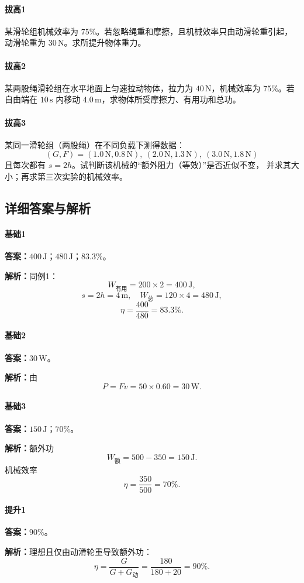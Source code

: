 \documentclass[12pt,a4paper]{ctexart}
\newcommand{\Ans}[1]{\par\noindent\textbf{答案：}#1\par}
\newcommand{\Sol}[1]{\par\noindent\textbf{解析：}#1\par}
\begin{document}
\paragraph{拔高1}
某滑轮组机械效率为 $75\%$。若忽略绳重和摩擦，且机械效率只由动滑轮重引起，
动滑轮重为 $30\,\mathrm{N}$。求所提升物体重力。

\paragraph{拔高2}
某两股绳滑轮组在水平地面上匀速拉动物体，拉力为 $40\,\mathrm{N}$，机械效率为
$75\%$。若自由端在 $10\,\mathrm{s}$ 内移动 $4.0\,\mathrm{m}$，求物体所受摩擦力、有用功和总功。

\paragraph{拔高3}
某同一滑轮组（两股绳）在不同负载下测得数据：
\[
(G,F)=(1.0\,\mathrm{N},0.8\,\mathrm{N}),\ (2.0\,\mathrm{N},1.3\,\mathrm{N}),\ (3.0\,\mathrm{N},1.8\,\mathrm{N})
\]
且每次都有 $s=2h$。试判断该机械的“额外阻力（等效）”是否近似不变，
并求其大小；再求第三次实验的机械效率。

\subsection{详细答案与解析}

\paragraph{基础1}
\Ans{$400\,\mathrm{J}$；$480\,\mathrm{J}$；$83.3\%$。}
\Sol{同例1：
\[
W_{\text{有用}}=200\times 2=400\,\mathrm{J},
\]
\[
s=2h=4\,\mathrm{m},\quad W_{\text{总}}=120\times 4=480\,\mathrm{J},
\]
\[
\eta=\frac{400}{480}=83.3\%.
\]}

\paragraph{基础2}
\Ans{$30\,\mathrm{W}$。}
\Sol{由
\[
P=Fv=50\times 0.60=30\,\mathrm{W}.
\]}

\paragraph{基础3}
\Ans{$150\,\mathrm{J}$；$70\%$。}
\Sol{额外功
\[
W_{\text{额}}=500-350=150\,\mathrm{J}.
\]
机械效率
\[
\eta=\frac{350}{500}=70\%.
\]}

\paragraph{提升1}
\Ans{$90\%$。}
\Sol{理想且仅由动滑轮重导致额外功：
\[
\eta=\frac{G}{G+G_{\text{动}}}=\frac{180}{180+20}=90\%.
\]}
\end{document}
